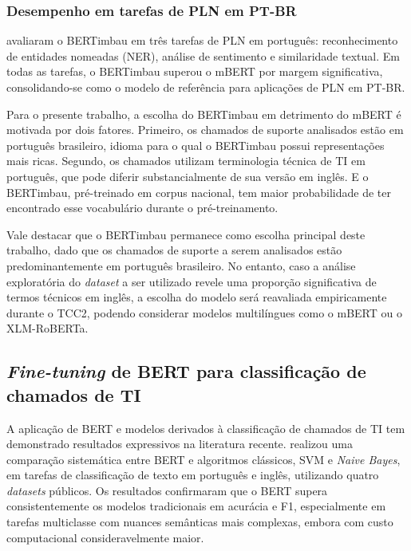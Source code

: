 \documentclass[
    12pt,                %
    openright,           %
    oneside,             %
    a4paper,             %
    english,             %
    brazil               %
]{abntex2}
\begin{document}
\subsubsection{Desempenho em tarefas de PLN em PT-BR}
\label{subsubsec:bertimbau_desempenho}

 avaliaram o BERTimbau em três tarefas de PLN em português: reconhecimento de entidades nomeadas (NER), análise de sentimento e similaridade textual. Em todas as tarefas, o BERTimbau superou o mBERT por margem significativa, consolidando-se como o modelo de referência para aplicações de PLN em PT-BR.

Para o presente trabalho, a escolha do BERTimbau em detrimento do mBERT é motivada por dois fatores. Primeiro, os chamados de suporte analisados estão em português brasileiro, idioma para o qual o BERTimbau possui representações mais ricas. Segundo, os chamados utilizam terminologia técnica de TI em português, que pode diferir substancialmente de sua versão em inglês. E o BERTimbau, pré-treinado em corpus nacional, tem maior probabilidade de ter encontrado esse vocabulário durante o pré-treinamento.

Vale destacar que o BERTimbau permanece como escolha principal 
deste trabalho, dado que os chamados de suporte a serem analisados 
estão predominantemente em português brasileiro. No entanto, caso a 
análise exploratória do \textit{dataset} a ser utilizado revele 
uma proporção significativa de termos técnicos em inglês, a escolha 
do modelo será reavaliada empiricamente durante o TCC2, podendo 
considerar modelos multilíngues como o mBERT ou o XLM-RoBERTa.

\subsection{\textit{Fine-tuning} de BERT para classificação de chamados de TI}
\label{subsec:bert_tickets}

A aplicação de BERT e modelos derivados à classificação de chamados de TI tem demonstrado resultados expressivos na literatura recente.  realizou uma comparação sistemática entre BERT e algoritmos clássicos, SVM e \textit{Naive Bayes}, em tarefas de classificação de texto em português e inglês, utilizando quatro \textit{datasets} públicos. Os resultados confirmaram que o BERT supera consistentemente os modelos tradicionais em acurácia e F1, especialmente em tarefas multiclasse com nuances semânticas mais complexas, embora com custo computacional consideravelmente maior.
\end{document}
